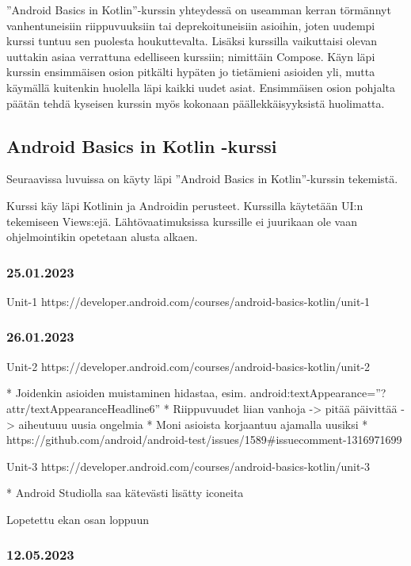 ''Android Basics in Kotlin''-kurssin yhteydessä on useamman kerran törmännyt
vanhentuneisiin riippuvuuksiin tai deprekoituneisiin asioihin, joten uudempi
kurssi tuntuu sen puolesta houkuttevalta. Lisäksi kurssilla vaikuttaisi olevan
uuttakin asiaa verrattuna edelliseen kurssiin; nimittäin Compose. Käyn läpi
kurssin ensimmäisen osion pitkälti hypäten jo tietämieni asioiden yli, mutta
käymällä kuitenkin huolella läpi kaikki uudet asiat. Ensimmäisen osion pohjalta
päätän tehdä kyseisen kurssin myös kokonaan päällekkäisyyksistä huolimatta.

\subsection{Android Basics in Kotlin -kurssi}

Seuraavissa luvuissa on käyty läpi ''Android Basics in Kotlin''-kurssin
tekemistä.

Kurssi käy läpi Kotlinin ja Androidin perusteet. Kurssilla käytetään UI:n
tekemiseen Views:ejä. Lähtövaatimuksissa kurssille ei juurikaan ole vaan
ohjelmointikin opetetaan alusta alkaen.

\subsubsection{25.01.2023}


Unit-1 https://developer.android.com/courses/android-basics-kotlin/unit-1

\subsubsection{26.01.2023}

Unit-2 https://developer.android.com/courses/android-basics-kotlin/unit-2

* Joidenkin asioiden muistaminen hidastaa, esim. android:textAppearance=''?attr/textAppearanceHeadline6''
* Riippuvuudet liian vanhoja -> pitää päivittää -> aiheutuuu uusia ongelmia
* Moni asioista korjaantuu ajamalla uusiksi
* https://github.com/android/android-test/issues/1589\#issuecomment-1316971699

Unit-3 https://developer.android.com/courses/android-basics-kotlin/unit-3

* Android Studiolla saa kätevästi lisätty iconeita

Lopetettu ekan osan loppuun

\subsubsection{12.05.2023}

